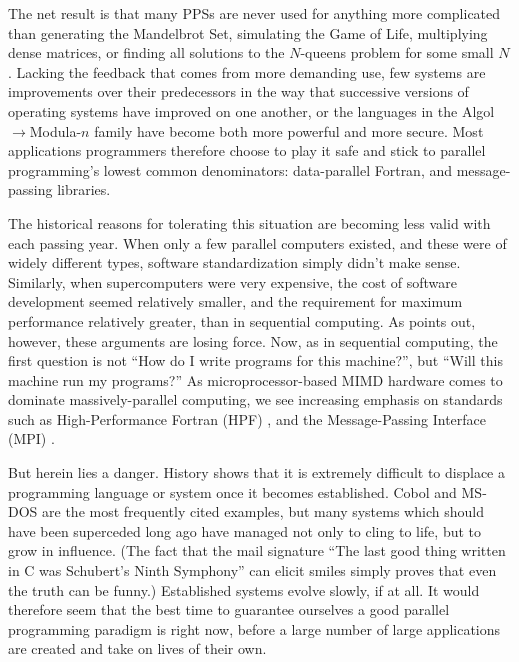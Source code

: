 The net result is that many PPSs are never used for anything more complicated than
generating the Mandelbrot Set,
simulating the Game of Life,
multiplying dense matrices,
or finding all solutions to the $N$-queens problem for some small $N$.
Lacking the feedback that comes from more demanding use,
few systems are improvements over their predecessors
in the way that successive versions of operating systems have improved on one another,
or the languages in the Algol$\rightarrow$Modula-$n$ family
have become both more powerful and more secure.
Most applications programmers therefore choose to play it safe
and stick to parallel programming's lowest common denominators:
data-parallel Fortran,
and message-passing libraries.

The historical reasons for tolerating this situation are becoming less valid with each passing year.
When only a few parallel computers existed,
and these were of widely different types,
software standardization simply didn't make sense.
Similarly,
when supercomputers were very expensive,
the cost of software development seemed relatively smaller,
and the requirement for maximum performance relatively greater,
than in sequential computing.
As \cite{b:social-limits-speed} points out,
however, these arguments are losing force.
Now,
as in sequential computing,
the first question is not ``How do I write programs for this machine?'',
but ``Will this machine run my programs?''
As microprocessor-based MIMD hardware comes to dominate massively-parallel computing,
we see increasing emphasis on standards such as High-Performance Fortran (HPF) \cite{b:hpf-overview},
and the Message-Passing Interface (MPI) \cite{b:mpi-overview}.

But herein lies a danger.
History shows that it is extremely difficult
to displace a programming language or system once it becomes established.
Cobol and MS-DOS are the most frequently cited examples,
but many systems which should have been superceded long ago have managed
not only to cling to life,
but to grow in influence.
(The fact that the mail signature
``The last good thing written in C was Schubert's Ninth Symphony''
can elicit smiles simply proves that even the truth can be funny.)
Established systems evolve slowly, if at all.
It would therefore seem that the best time to guarantee ourselves
a good parallel programming paradigm is right now,
before a large number of large applications are created and take on lives of their own.


